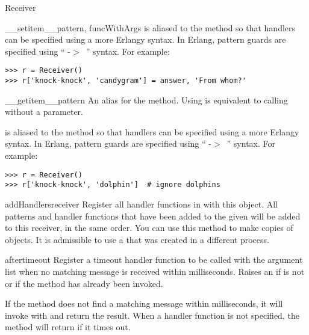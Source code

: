 \documentclass{howto}
\newcommand{\greaterthan}[0]{\begin{math}>\end{math}}
\newcommand{\greaterthan}[0]{>}
\begin{document}
\begin{classdesc}{Receiver}{}
\begin{methoddesc}{__setitem__}{pattern, funcWithArgs}
 is aliased to the  method so that
handlers can be specified using a more Erlangy syntax. In Erlang, pattern guards
are specified using `` -\greaterthan\ '' syntax. For
example:
\begin{verbatim}
>>> r = Receiver()
>>> r['knock-knock', 'candygram'] = answer, 'From whom?'
\end{verbatim}
\end{methoddesc}

\begin{methoddesc}{__getitem__}{pattern}
An alias for the  method. Using  is
equivalent to calling  without a  parameter.

 is aliased to the  method so that
handlers can be specified using a more Erlangy syntax. In Erlang, pattern guards
are specified using `` -\greaterthan\ '' syntax. For
example:
\begin{verbatim}
>>> r = Receiver()
>>> r['knock-knock', 'dolphin']  # ignore dolphins
\end{verbatim}
\end{methoddesc}

\begin{methoddesc}{addHandlers}{receiver}
Register all handler functions in  with this 
object. All patterns and handler functions that have been added to the given
 will be added to this receiver, in the same order. You can use
this method to make copies of  objects. It is admissible to
use a  that was created in a different process.
\end{methoddesc}

\begin{methoddesc}{after}{timeout}
Register a timeout handler function  to be called with the 
argument list when no matching message is received within 
milliseconds. Raises an  if  is not
 or if the  method has already been
invoked.

If the  method does not find a matching message within
 milliseconds, it will invoke  with  and return
the result. When a handler function  is not specified, the
 method will return  if it times out.


\end{methoddesc}
\end{classdesc}
\end{document}
